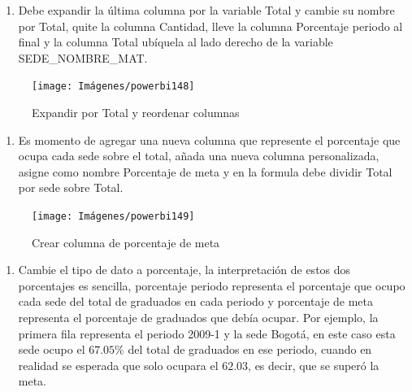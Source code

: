 \documentclass[
]{book}
\providecommand{\tightlist}{%
  \setlength{\itemsep}{0pt}\setlength{\parskip}{0pt}}
\begin{document}
\begin{enumerate}
\def\labelenumi{\arabic{enumi}.}
\setcounter{enumi}{16}
\tightlist
\item
  Debe expandir la última columna por la variable Total y cambie su nombre por Total, quite la columna Cantidad, lleve la columna Porcentaje periodo al final y la columna Total ubíquela al lado derecho de la variable SEDE\_NOMBRE\_MAT.
\end{enumerate}

\begin{figure}

{\centering \texttt{[image: Imágenes/powerbi148]} 

}

\caption{Expandir por Total y reordenar columnas}\label{fig:expandirportotal-fig}
\end{figure}

\begin{enumerate}
\def\labelenumi{\arabic{enumi}.}
\setcounter{enumi}{17}
\tightlist
\item
  Es momento de agregar una nueva columna que represente el porcentaje que ocupa cada sede sobre el total, añada una nueva columna personalizada, asigne como nombre Porcentaje de meta y en la formula debe dividir Total por sede sobre Total.
\end{enumerate}

\begin{figure}

{\centering \texttt{[image: Imágenes/powerbi149]} 

}

\caption{Crear columna de porcentaje de meta}\label{fig:porcentajedemeta-fig}
\end{figure}

\begin{enumerate}
\def\labelenumi{\arabic{enumi}.}
\setcounter{enumi}{18}
\tightlist
\item
  Cambie el tipo de dato a porcentaje, la interpretación de estos dos porcentajes es sencilla, porcentaje periodo representa el porcentaje que ocupo cada sede del total de graduados en cada periodo y porcentaje de meta representa el porcentaje de graduados que debía ocupar. Por ejemplo, la primera fila representa el periodo 2009-1 y la sede Bogotá, en este caso esta sede ocupo el \(67.05\%\) del total de graduados en ese periodo, cuando en realidad se esperada que solo ocupara el \(62.03%
  \), es decir, que se superó la meta.
\end{enumerate}
\end{document}
